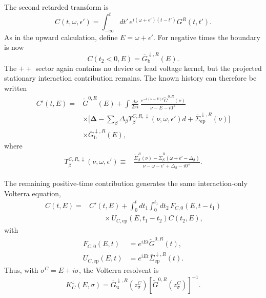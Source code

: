 \documentclass[
 reprint,
 superscriptaddress,
 amsmath,amssymb,
 aps,prb,
 longbibliography,
 floatfix
]{revtex4-2}
\newcommand{\ep}{\mathrm{ep}}
\newcommand{\barSigma}{\overline{\Sigma}}
\begin{document}
The second retarded transform is
\begin{equation*}
C(t,\omega,\epsilon')
=
\int_{-\infty}^{t}dt'\,
e^{i(\omega+\epsilon')(t-t')}
G^R(t,t').
\end{equation*}
As in the upward calculation, define $E=\omega+\epsilon'$. For negative times the boundary is now
\begin{equation*}
C(t_2<0,E)
=
\overline G_{\mathrm b}^{\downarrow,R}(E).
\end{equation*}
The $++$ sector again contains no device or lead voltage kernel, but the projected stationary interaction contribution remains. The known history can therefore be written
\begin{equation*}
\begin{aligned}
C'(t,E)
={}&
\widetilde G^{0,R}(E)
+
\int\frac{d\nu}{2\pi i}\,
\frac{
e^{-i(\nu-E)t}
\widetilde G^{0,R}(\nu)}
{\nu-E-i0^+}
\\
&\times
\Bigg[
\bm\Delta
-
\sum_\beta
\Delta_\beta
\Upsilon_\beta^{C,R,\downarrow}
(\nu,\omega,\epsilon')
d+
\barSigma_{\ep}^{\downarrow,R}(\nu)
\Bigg]
\\
&\times\overline G_{\mathrm b}^{\downarrow,R}(E),
\end{aligned}
\end{equation*}
where
\begin{equation*}
\begin{aligned}
\Upsilon_\beta^{C,R,\downarrow}
(\nu,\omega,\epsilon')
\equiv{}&
\frac{
\widetilde\Sigma_\beta^R(\nu)
-
\widetilde\Sigma_\beta^R
(\omega+\epsilon'-\Delta_\beta)}
{
\nu-\omega-\epsilon'
+\Delta_\beta-i0^+
}.
\end{aligned}
\end{equation*}

The remaining positive-time contribution generates the same interaction-only Volterra equation,
\begin{equation*}
\begin{aligned}
C(t,E)
={}&
C'(t,E)
+
\int_0^t dt_1
\int_0^{t_1}dt_2\,
F_{C,0}(E,t-t_1)
\\
&\qquad\times
U_{C,\ep}(E,t_1-t_2)
C(t_2,E),
\end{aligned}
\end{equation*}
with
\begin{align*}
F_{C,0}(E,t)
&=
e^{iEt}
\widetilde G^{0,R}(t),
\\
U_{C,\ep}(E,t)
&=
e^{iEt}
\barSigma_{\ep}^{\downarrow,R}(t).
\end{align*}
Thus, with $\sigma^C =E+i\sigma$, the Volterra resolvent is
\begin{equation*}
K_C^\downarrow(E,\sigma)
=
\overline G_{\mathrm u}^{\downarrow,R}
(z_\sigma^C)
\left[
\widetilde G^{0,R}(z_\sigma^C)
\right]^{-1}.
\end{equation*}
\end{document}
